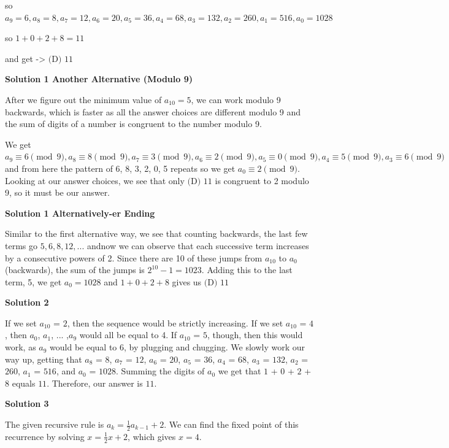 \begin{enumerate}
 so $a_9 = 6, a_8 = 8, a_7 = 12, a_6 = 20, a_5 = 36, a_4 = 68, a_3 = 132, a_2 = 260, a_1 = 516, a_0 = 1028$

 so $1+0+2+8=11$

 and get    ->  $\boxed{\text{(D) }11}$




\textbf{Solution 1 Another Alternative (Modulo 9)}

After we figure out the minimum value of $a_{10} = 5$, we can work modulo 9 backwards, which is faster as all the answer choices are different modulo 9 and the sum of digits of a number is congruent to the number modulo 9. 

 We get $a_9 \equiv 6 \pmod{9}, a_8 \equiv 8 \pmod{9}, a_7 \equiv 3 \pmod{9}, a_6 \equiv 2 \pmod{9}, a_5 \equiv 0 \pmod{9}, a_4 \equiv 5 \pmod{9}, a_3 \equiv 6 \pmod{9}$ and from here the pattern of 6, 8, 3, 2, 0, 5 repeats so we get $a_0 \equiv 2 \pmod{9}$. Looking at our answer choices, we see that only $\boxed{\text{(D) }11}$ is congruent to 2 modulo 9, so it must be our answer.

 



\textbf{Solution 1 Alternatively-er Ending}

Similar to the first alternative way, we see that counting backwards, the last few terms go $5, 6, 8, 12, ...$ andnow we can observe that each successive term increases by a consecutive powers of 2. Since there are 10 of these jumps from $a_{10}$  to $a_0$ (backwards), the sum of the jumps is $2^{10}-1=1023$. Adding this to the last term, 5, we get $a_0=1028$ and $1+0+2+8$ gives us $\boxed{\text{(D) }11}$




\textbf{Solution 2}

If we set $a_{10}$ = $2$, then the sequence would be strictly increasing. If we set $a_{10}$ = $4$, then $a_0$, $a_1$, ... ,$a_9$ would all be equal to 4. If $a_{10}$ = $5$, though, then this would work, as $a_9$ would be equal to $6$, by plugging and chugging. We slowly work our way up, getting that $a_8$ = $8$, $a_7$ = $12$, $a_6$ = $20$, $a_5$ = $36$, $a_4$ = $68$, $a_3$ = $132$, $a_2$ = $260$, $a_1$ = $516$, and $a_0$ = $1028$. Summing the digits of $a_0$ we get that $1$ + $0$ + $2$ + $8$ equals $11$. Therefore, our answer is $11$.

 



\textbf{Solution 3}

The given recursive rule is $a_k = \frac{1}{2}a_{k-1} + 2$. We can find the fixed point of this recurrence by solving $x = \frac{1}{2}x + 2$, which gives $x = 4$.


\end{enumerate}

